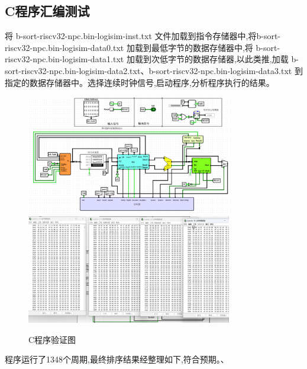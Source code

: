 \documentclass{article}
\begin{document}
    \subsection{C程序汇编测试}
    将 b-sort-riscv32-npc.bin-logisim-inst.txt 文件加载到指令存储器中,将b-sort-riscv32-npc.bin-logisim-data0.txt 加载到最低字节的数据存储器中,将 b-sort-riscv32-npc.bin-logisim-data1.txt 加载到次低字节的数据存储器,以此类推,加载 b-sort-riscv32-npc.bin-logisim-data2.txt、b-sort-riscv32-npc.bin-logisim-data3.txt 到指定的数据存储器中。选择连续时钟信号,启动程序,分析程序执行的结果。
    \begin{figure}[H]
        \centering
        \includegraphics[width=0.8\textwidth]{5.5.1.png}
        \includegraphics[width=0.8\textwidth]{5.5.2.png}
        \caption{C程序验证图}
    \end{figure}
    程序运行了1348个周期,最终排序结果经整理如下,符合预期。、
\end{document}
